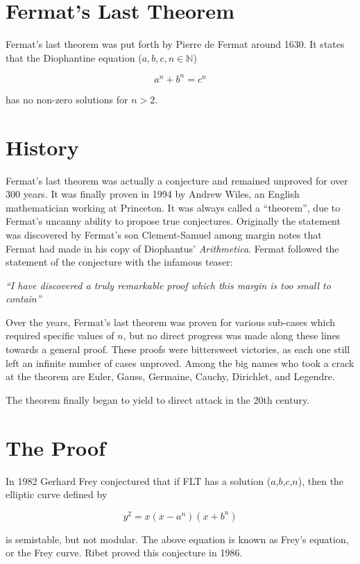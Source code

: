 \documentclass{article}
\begin{document}
\section{Fermat's Last Theorem}

Fermat's last theorem was put forth by Pierre de Fermat around 1630.  It states that the Diophantine equation ($a, b, c, n \in \mathbb{N}$)

$$ a^n + b^n = c^n $$

has no non-zero solutions for $n>2$. 

\section{History}

Fermat's last theorem was actually a conjecture and remained unproved for over 300 years.  It was finally proven in 1994 by Andrew Wiles, an English mathematician working at Princeton.  It was always called a ``theorem'', due to Fermat's uncanny ability to propose true conjectures. Originally the statement was discovered by Fermat's son Clement-Samuel among margin notes that Fermat had made in his copy of Diophantus' \emph{Arithmetica}.  Fermat followed the statement of the conjecture with the infamous teaser:

{\it ``I have discovered a truly remarkable proof which this margin is too small to contain''}

Over the years, Fermat's last theorem was proven for various sub-cases which required specific values of $n$, but no direct progress was made along these lines towards a general proof.  These proofs were bittersweet victories, as each one still left an infinite number of cases unproved.  Among the big names who took a crack at the theorem are Euler, Gauss, Germaine, Cauchy, Dirichlet, and Legendre.  

The theorem finally began to yield to direct attack in the 20th century.

\section{The Proof}

In 1982 Gerhard Frey conjectured that if FLT has a solution ($a$,$b$,$c$,$n$), then the elliptic curve defined by

$$ y^2 = x(x-a^n)(x+b^n) $$

is semistable, but not modular.  The above equation is known as Frey's equation, or the Frey curve. Ribet proved this conjecture in 1986.
\end{document}
